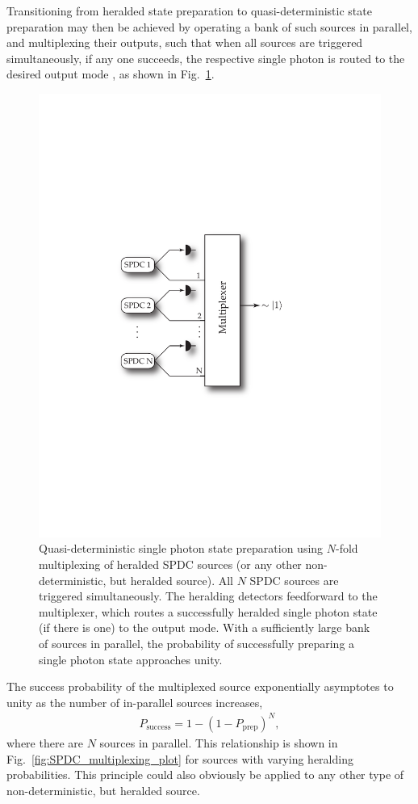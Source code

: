 \documentclass[aps,rmp,twocolumn,amsmath,amssymb,nofootinbib,superscriptaddress,longbibliography,floatfix,table-of-contents,eqsecnum]{revtex4-1}
\begin{document}
Transitioning from heralded state preparation to quasi-deterministic state preparation may then be achieved by operating a bank of such sources in parallel, and multiplexing their outputs, such that when all sources are triggered simultaneously, if any one succeeds, the respective single photon is routed to the desired output mode \cite{???}, as shown in Fig.~\ref{fig:SPDC_multiplexing_arch}.

\begin{figure}[!htb]
\includegraphics[width=0.75\columnwidth]{SPDC_multiplexing_arch}
\caption{Quasi-deterministic single photon state preparation using $N$-fold multiplexing of heralded SPDC sources (or any other non-deterministic, but heralded source). All $N$ SPDC sources are triggered simultaneously. The heralding detectors feedforward to the multiplexer, which routes a successfully heralded single photon state (if there is one) to the output mode. With a sufficiently large bank of sources in parallel, the probability of successfully preparing a single photon state approaches unity.} \label{fig:SPDC_multiplexing_arch}
\end{figure}

The success probability of the multiplexed source exponentially asymptotes to unity as the number of in-parallel sources increases,
\begin{align} \label{eq:SPDC_multiplex}
P_\text{success} = 1 - (1-P_\text{prep})^N,
\end{align}
where there are $N$ sources in parallel. This relationship is shown in Fig.~\ref{fig:SPDC_multiplexing_plot} for sources with varying heralding probabilities. This principle could also obviously be applied to any other type of non-deterministic, but heralded source.
\end{document}
